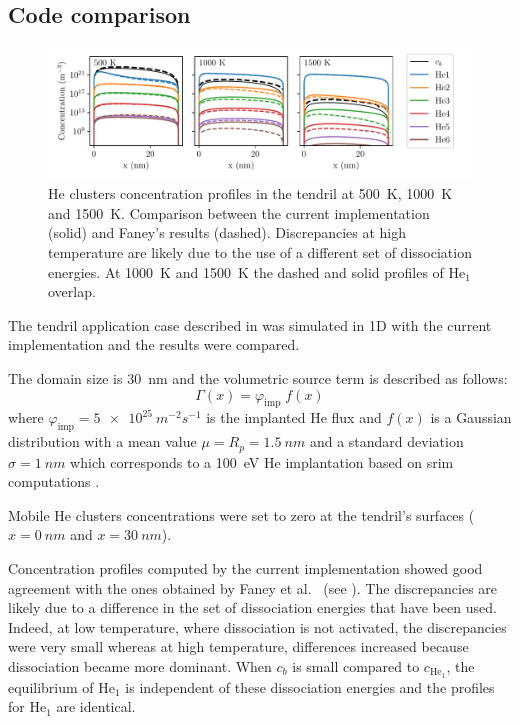 \subsection{Code comparison} 

\begin{figure}
    \centering
    \includegraphics[width=\linewidth]{Figures/Chapter4/profiles_tendrils.pdf}
    \caption{He clusters concentration profiles in the \gls{tendril} at \SI{500}{K}, \SI{1000}{K} and \SI{1500}{K}. Comparison between the current implementation (solid) and Faney's results \cite{faney_spatially_2015} (dashed).  Discrepancies at high temperature are likely due to the use of a different set of dissociation energies. At \SI{1000}{K} and \SI{1500}{K} the dashed and solid profiles of He$_1$ overlap.}
\end{figure}

The \gls{tendril} application case described in \cite{faney_spatially_2015} was simulated in 1D with the current implementation and the results were compared.

The domain size is \SI{30}{nm} and the volumetric source term is described as follows:
\begin{equation}
    \Gamma(x) = \varphi_\mathrm{imp} \; f(x) 
\end{equation}
where $\varphi_\mathrm{imp} = \SI{5e25}{m^{-2} s^{-1}}$ is the implanted He flux and $f(x)$ is a Gaussian distribution with a mean value $\mu = R_p = \SI{1.5}{nm}$ and a standard deviation $\sigma = \SI{1}{nm}$ which corresponds to a \SI{100}{eV} He implantation based on \gls{srim} computations .

Mobile He clusters concentrations were set to zero at the \gls{tendril}'s surfaces ($x=\SI{0}{nm}$ and $x=\SI{30}{nm}$).

Concentration profiles computed by the current implementation showed good agreement with the ones obtained by Faney et al.\ \cite{faney_spatially_2015} (see ).
The discrepancies are likely due to a difference in the set of dissociation energies that have been used.
Indeed, at low temperature, where dissociation is not activated, the discrepancies were very small whereas at high temperature, differences increased because dissociation became more dominant.
When $c_b$ is small compared to $c_{\mathrm{He}_1}$, the equilibrium of $\mathrm{He}_1$ is independent of these dissociation energies and the profiles for $\mathrm{He}_1$ are identical.

